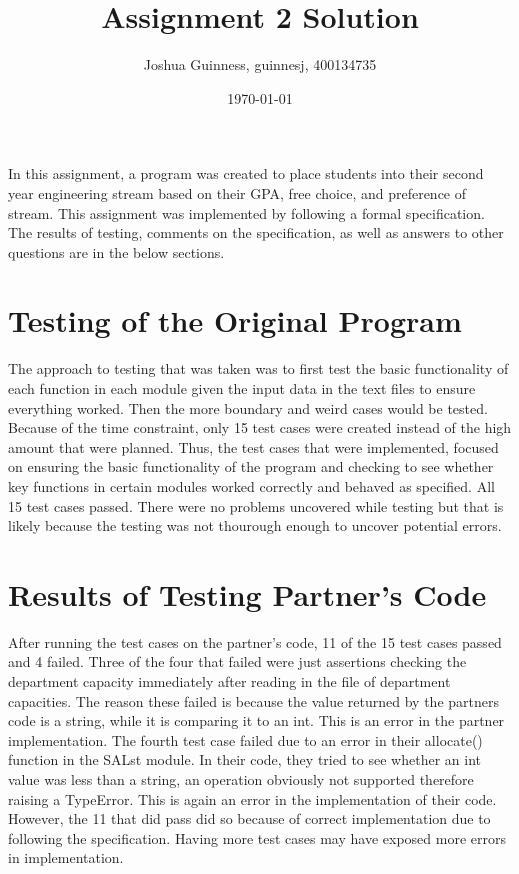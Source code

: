 \documentclass[12pt]{article}
\title{Assignment 2 Solution}
\author{Joshua Guinness, guinnesj, 400134735}
\date{\today}
\begin{document}
\maketitle

In this assignment, a program was created to place students into their second year engineering stream
based on their GPA, free choice, and preference of stream. This assignment was implemented by following a formal
specification. The results of testing, comments on the specification, as well as answers to other questions are in the below sections.

\section{Testing of the Original Program}

The approach to testing that was taken was to first test the basic functionality of each function in each module
given the input data in the text files to ensure everything worked. Then the more boundary and weird cases would be tested.
Because of the time constraint, only 15 test cases were created instead of the high amount that were planned. Thus, the test cases that were implemented, focused on ensuring the basic functionality of the program and checking
to see whether key functions in certain modules worked correctly and behaved as specified. All 15 test cases passed. There
were no problems uncovered while testing but that is likely because the testing was not thourough enough to uncover potential errors.

\section{Results of Testing Partner's Code}

After running the test cases on the partner's code, 11 of the 15 test cases passed and 4 failed. Three of the four that failed
were just assertions checking the department capacity immediately after reading in the file of department capacities. The reason these
failed is because the value returned by the partners code is a string, while it is comparing it to an int. This is an error
in the partner implementation. The fourth test case failed due to an error in their allocate() function in the SALst module. In their
code, they tried to see whether an int value was less than a string, an operation obviously not supported therefore raising a TypeError.
This is again an error in the implementation of their code. However, the 11 that did pass did so because of correct implementation due
to following the specification. Having more test cases may have exposed more errors in implementation.
\end{document}
